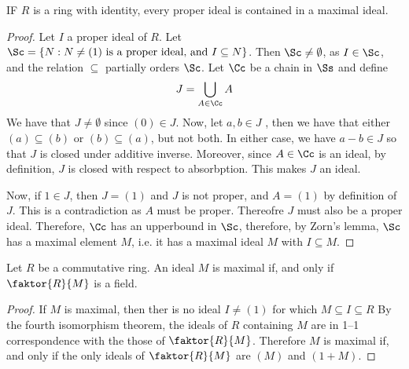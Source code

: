 \begin{lemma}\label{1.4.2}
    IF $R$ is a ring with identity, every proper ideal is contained in a maximal
    ideal.
\end{lemma}
\begin{proof}
    Let $I$ a proper ideal of $R$. Let $\Sc=\{N : N \neq (1) \text{ is a proper
    ideal, and } I \subseteq N\}$. Then $\Sc \neq \emptyset$, as  $I \in \Sc$,
    and the relation $\subseteq$ partially orders $\Sc$. Let  $\Cc$ be a chain
    in  $\Ss$ and define
    \begin{equation*}
        J=\bigcup_{A \in \Cc}{A}
    \end{equation*}
    We have that $J \neq \emptyset$ since  $(0) \in J$. Now, let $a,b \in J$ ,
    then we have that either  $(a) \subseteq (b)$ or $(b) \subseteq (a)$, but
    not both. In either case, we have $a-b \in J$ so that  $J$ is closed under
    additive inverse. Moreover, since  $A \in \Cc$ is an ideal, by definition,
    $J$ is closed with respect to absorbption. This makes  $J$ an ideal.

    Now, if  $1 \in J$, then $J=(1)$ and $J$ is not proper, and $A=(1)$ by
    definition of $J$. This is a contradiction as $A$ must be proper. Thereofre
    $J$ must also be a proper ideal. Therefore,  $\Cc$ has an upperbound in
    $\Sc$, therefore, by Zorn's lemma,  $\Sc$ has a maximal element  $M$, i.e.
    it has a maximal ideal  $M$ with  $I \subseteq M$.
\end{proof}

\begin{lemma}\label{1.4.3}
    Let $R$ be a commutative ring. An ideal  $M$ is maximal if, and only if
    $\faktor{R}{M}$ is a field.
\end{lemma}
\begin{proof}
    If $M$ is maximal, then ther is no ideal $I \neq (1)$ for which $M \subseteq
    I \subseteq R$ By the fourth isomorphism theorem, the ideals of  $R$
    containing  $M$ are in 1--1 correspondence with the those of
    $\faktor{R}{M}$. Therefore $M$ is maximal if, and only if the only ideals of
     $\faktor{R}{M}$ are $(M)$ and $(1+M)$.
\end{proof}

